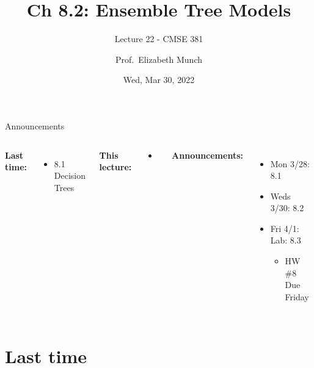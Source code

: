 \documentclass[aspectratio=169,usenames,dvipsnames]{beamer}
\begin{document}
\title[]{Ch 8.2: Ensemble Tree Models}
\subtitle{Lecture 22 - CMSE 381}
\date{Wed, Mar 30, 2022}



\author[Dr.~Munch]{Prof.~Elizabeth Munch}

\begin{frame}
 \titlepage


\end{frame}
\begin{frame}[c]{Announcements }

\begin{columns}
\centering

	\textbf{Last time:}
	\begin{itemize}
	\item 8.1 Decision Trees
	\end{itemize}

	\vspace{.2in}

	\textbf{This lecture:}
	\begin{itemize}
	\item
\end{itemize}


\centering

\textbf{Announcements:}
	\begin{itemize}
	\item Mon 3/28: 8.1
	\item Weds 3/30: 8.2
	\item Fri 4/1: Lab: 8.3
	\begin{itemize}
		\item HW \#8 Due Friday
	\end{itemize}

	\end{itemize}
\end{columns}

\end{frame}



\section{Last time}
\end{document}

